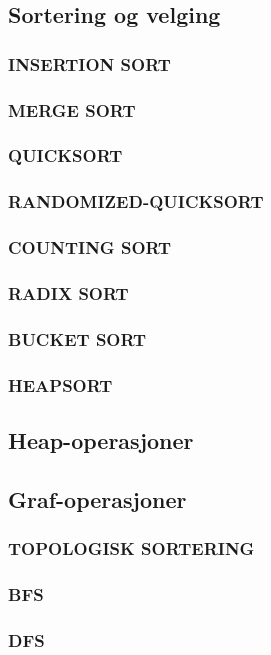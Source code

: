 \subsection{Sortering og velging}
\subsubsection{INSERTION SORT}
\subsubsection{MERGE SORT}
\subsubsection{QUICKSORT}
\subsubsection{RANDOMIZED-QUICKSORT}
\subsubsection{COUNTING SORT}
\subsubsection{RADIX SORT}
\subsubsection{BUCKET SORT}
\subsubsection{HEAPSORT}
\subsection{Heap-operasjoner}
\subsection{Graf-operasjoner}
\subsubsection{TOPOLOGISK SORTERING}
\subsubsection{BFS}
\subsubsection{DFS}
